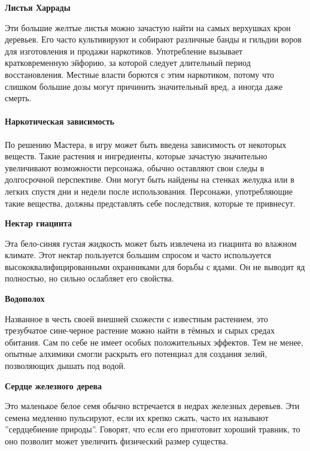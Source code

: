 \documentclass[a4paper, 9pt, twocolumn]{book}
\begin{document}
	\noindent \textbf{Листья Харрады}
	
	\smallskip
	
	\noindent Эти большие желтые листья можно зачастую найти на самых верхушках крон деревьев.  Его часто культивируют и собирают различные банды и гильдии воров для изготовления и продажи наркотиков. Употребление вызывает кратковременную эйфорию, за которой следует длительный период восстановления. Местные власти борются с этим наркотиком, потому что слишком большие дозы могут причинить значительный вред, а иногда даже смерть.
	
	\paragraph*{Наркотическая зависимость}
	
	\noindent По решению Мастера, в игру может быть введена зависимость от некоторых веществ. Такие растения и ингредиенты, которые зачастую значительно увеличивают возможности персонажа, обычно оставляют свои следы в долгосрочной перспективе. Они могут быть найдены на стенках желудка или в легких спустя дни и недели после использования. Персонажи, употребляющие такие вещества, должны представлять себе последствия, которые те привнесут.
	
	\medspace
	
	\noindent \textbf{Нектар гиацинта}
	
	\noindent Эта бело-синяя густая жидкость может быть извлечена из гиацинта во влажном климате. Этот нектар пользуется большим спросом и часто используется высококвалифицированными охранниками для борьбы с ядами. Он не выводит яд полностью, но сильно ослабляет его свойства.
	
	\medspace
	
	\noindent \textbf{Водополох}
	
	\smallskip
	
	\noindent Названное в честь своей внешней схожести с известным растением, это трезубчатое сине-черное растение можно найти в тёмных и сырых средах обитания. Сам по себе не имеет особых положительных эффектов. Тем не менее, опытные алхимики смогли раскрыть его потенциал для создания зелий, позволяющих дышать под водой.
	
	\medspace
	
	\noindent \textbf{Сердце железного дерева}
	
	\smallskip
	
	\noindent Это маленькое белое семя обычно встречается в недрах железных деревьев. Эти семена медленно пульсируют, если их крепко сжать, часто их называют ''сердцебиение природы''. Говорят, что если его приготовит хороший травник, то оно позволит может увеличить физический размер существа.
	
\end{document}
